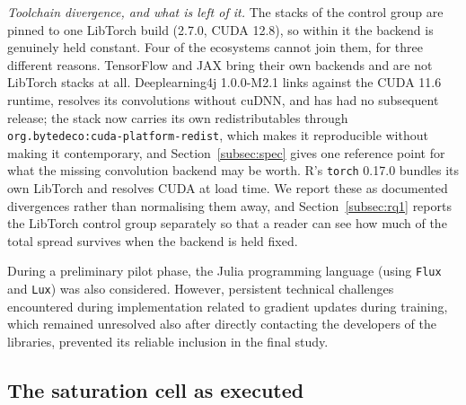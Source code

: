 \emph{Toolchain divergence, and what is left of it.} The \vCtrlStacks{}
stacks of the control group are pinned to one LibTorch build (2.7.0, CUDA 12.8),
so within it the backend is genuinely held constant. Four of the
\vEcosystems{} ecosystems cannot join them, for three different reasons. TensorFlow and JAX
bring their own backends and are not LibTorch stacks at all.
Deeplearning4j 1.0.0-M2.1 links against the CUDA 11.6 runtime, resolves its
convolutions without cuDNN, and has had no subsequent release; the stack now
carries its own redistributables through
\texttt{org.bytedeco:cuda-platform-redist}, which makes it reproducible without
making it contemporary, and Section~\ref{subsec:spec} gives one reference
point for what the missing convolution backend may be worth. R's \texttt{torch} 0.17.0 bundles its own
LibTorch and
resolves CUDA at load time. We report these as documented divergences rather
than normalising them away, and Section~\ref{subsec:rq1} reports the LibTorch
control group separately so that a reader can see how much of the total spread
survives when the backend is held fixed.



During a preliminary pilot phase, the Julia programming language (using \texttt{Flux} and \texttt{Lux}) was also considered. However, persistent technical challenges encountered during implementation related to gradient updates during training, which remained unresolved also after directly contacting the developers of the libraries, prevented its reliable inclusion in the final study.

\subsection{The saturation cell as executed}
\label{app:saturation-exec}

